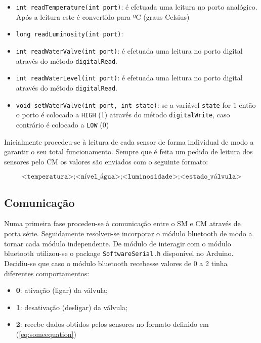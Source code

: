 \begin{itemize}
	\item \texttt{int readTemperature(int port)}: é efetuada uma leitura no porto analógico. Após a leitura este é convertido para ºC (graus Celsius)
	
	\item \texttt{long readLuminosity(int port)}: 
	
	\item \texttt{int readWaterValve(int port)}: é efetuada uma leitura no porto digital através do método \texttt{digitalRead}. 
	
	\item \texttt{int readWaterLevel(int port)}: é efetuada uma leitura no porto digital através do método \texttt{digitalRead}.
	
	
	\item \texttt{void setWaterValve(int port, int state)}: se a variável \texttt{state} for 1 então o porto é colocado a \texttt{HIGH} (1) através do método \texttt{digitalWrite}, caso contrário é colocado a \texttt{LOW} (0)
	
\end{itemize}

Inicialmente procedeu-se à leitura de cada sensor de forma individual de modo a garantir o seu total funcionamento. Sempre que é feita um pedido de leitura dos sensores pelo \ac{CM} os valores são enviados com o seguinte formato: 

\begin{equation} 
\label{eq:someequation}
\texttt{<temperatura>;<nível\_água>;<luminosidade>;<estado\_válvula>}
\end{equation}

\subsection{Comunicação}


Numa primeira fase procedeu-se à comunicação entre o \ac{SM} e \ac{CM} através de porta série. Seguidamente resolveu-se incorporar o módulo bluetooth de modo a tornar cada módulo independente. De módulo de interagir com o módulo bluetooth utilizou-se o package \texttt{SoftwareSerial.h} disponível no Arduino. Decidiu-se que caso o módulo bluetooth recebesse valores de 0 a 2 tinha diferentes comportamentos: 

\begin{itemize}
	\item \textbf{0}: ativação (ligar) da válvula; 
	\item \textbf{1}: desativação (desligar) da válvula; 
	\item \textbf{2}: recebe dados obtidos pelos sensores no formato definido em (\ref{eq:someequation})
\end{itemize}

